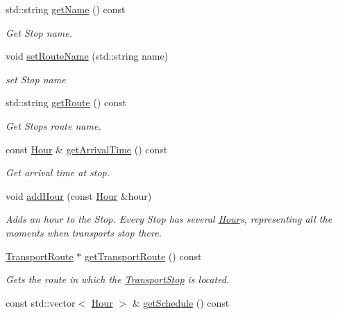 \begin{DoxyCompactItemize}
\item 
std\+::string \hyperlink{class_transport_stop_a517602c38c031001c46bf176261fc8f3}{get\+Name} () const 
\begin{DoxyCompactList}\small\item\em Get Stop name. \end{DoxyCompactList}\item 
void \hyperlink{class_transport_stop_aaa6a1aa4b046a530ef443fcde0e04cfa}{set\+Route\+Name} (std\+::string name)
\begin{DoxyCompactList}\small\item\em set Stop name \end{DoxyCompactList}\item 
std\+::string \hyperlink{class_transport_stop_a22ed12a90c26edcc285b94bf9e345177}{get\+Route} () const 
\begin{DoxyCompactList}\small\item\em Get Stop\textquotesingle{}s route name. \end{DoxyCompactList}\item 
const \hyperlink{class_hour}{Hour} \& \hyperlink{class_transport_stop_a78b98922c8778bf781b6c194e2e6d39f}{get\+Arrival\+Time} () const 
\begin{DoxyCompactList}\small\item\em Get arrival time at stop. \end{DoxyCompactList}\item 
void \hyperlink{class_transport_stop_a5c5dabee8026a55ab610c5c57724adef}{add\+Hour} (const \hyperlink{class_hour}{Hour} \&hour)
\begin{DoxyCompactList}\small\item\em Adds an hour to the Stop. Every Stop has several \hyperlink{class_hour}{Hour}\textquotesingle{}s, representing all the moments when transports stop there. \end{DoxyCompactList}\item 
\hyperlink{class_transport_route}{Transport\+Route} $\ast$ \hyperlink{class_transport_stop_abc8403a9e107f7dcb8edc525aef7ed3c}{get\+Transport\+Route} () const 
\begin{DoxyCompactList}\small\item\em Gets the route in which the \hyperlink{class_transport_stop}{Transport\+Stop} is located. \end{DoxyCompactList}\item 
const std\+::vector$<$ \hyperlink{class_hour}{Hour} $>$ \& \hyperlink{class_transport_stop_a912501b3b2bb1a68ee443a0fb66575ad}{get\+Schedule} () const 

\end{DoxyCompactItemize}
